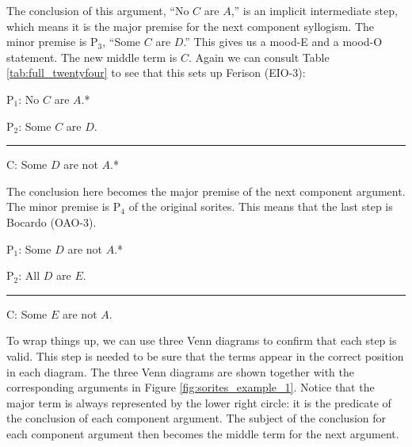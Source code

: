 The conclusion of this argument, ``No $C$ are $A$,'' is an implicit intermediate step, which means it is the major premise for the next component syllogism. The minor premise is P$_3$, ``Some $C$ are $D$.'' This gives us a mood-E and a mood-O statement. The new middle term is $C$. Again we can consult Table \ref{tab:full_twentyfour} to see that this sets up Ferison (EIO-3): 

\begin{earg}
\item[P$_1$:] No $C$ are $A$.*
\item[P$_2$:] Some $C$ are $D$.%
\vspace{-.5em}
\item [] \rule{0.2\linewidth}{.5pt} 
\item[C:] Some $D$ are not $A$.* 
\end{earg}

The conclusion here becomes the major premise of the next component argument. The minor premise is P$_4$ of the original sorites. This means that the last step is Bocardo (OAO-3). 

\begin{earg}
\item[P$_1$:] Some $D$ are not $A$.* 
\item[P$_2$:] All $D$ are $E$.
\vspace{-.5em}
\item [] \rule{0.2\linewidth}{.5pt} 
\item[C:] Some $E$ are not $A$. 
\end{earg} 

To wrap things up, we can use three Venn diagrams to confirm that each step is valid. This step is needed to be sure that the terms appear in the correct position in each diagram. The three Venn diagrams are shown together with the corresponding arguments in Figure \ref{fig:sorites_example_1}. Notice that the major term is always represented by the lower right circle: it is the predicate of the conclusion of each component argument. The subject of the conclusion for each component argument then becomes the middle term for the next argument. 

